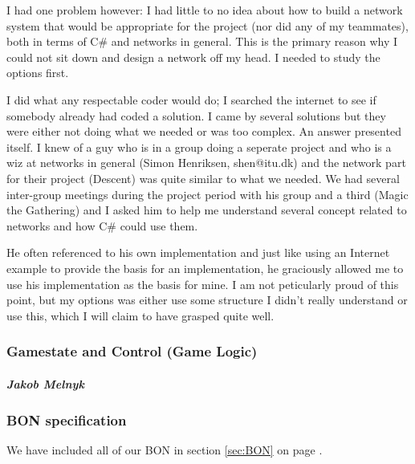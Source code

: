 I had one problem however: I had little to no idea about how to build a network system that would be appropriate for the project (nor did any of my teammates), both in terms of C\# and networks in general. 
This is the primary reason why I could not sit down and design a network off my head. I needed to study the options first.

I did what any respectable coder would do; I searched the internet to see if somebody already had coded a solution. 
I came by several solutions but they were either not doing what we needed or was too complex.
An answer presented itself. I knew of a guy who is in a group doing a seperate project and who is a wiz at networks in general (Simon Henriksen, shen@itu.dk) and the network part for their project (Descent) was quite similar to what we needed. 
We had several inter-group meetings during the project period with his group and a third (Magic the Gathering) and I asked him to help me understand several concept related to networks and how C\# could use them.

He often referenced to his own implementation and just like using an Internet example to provide the basis for an implementation, he graciously allowed me to use his implementation as the basis for mine.
I am not peticularly proud of this point, but my options was either use some structure I didn't really understand or use this, which I will claim to have grasped quite well.

\subsubsection{Gamestate and Control (Game Logic)}
\subparagraph{Jakob Melnyk}



\subsubsection{BON specification}
We have included all of our BON in section \ref{sec:BON} on page \pageref{sec:BON}.